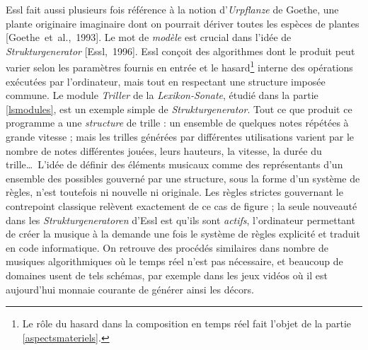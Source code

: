 \documentclass[a4paper,12pt]{article}
\newcommand{\cicite}[1]{{\footnotesize[#1]}}
\begin{document}
Essl fait aussi plusieurs fois référence à la notion d'\emph{Urpflanze} de Goethe, une plante originaire imaginaire dont on pourrait dériver toutes les espèces de plantes \cicite{Goethe~et~al.,~1993}. Le mot de \emph{modèle} est crucial dans l'idée de \emph{Strukturgenerator} \cicite{Essl,~1996}. Essl conçoit des algorithmes dont le produit peut varier selon les paramètres fournis en entrée et le hasard\footnote{Le rôle du hasard dans la composition en temps réel fait l'objet de la partie \ref{aspectsmateriels}.} interne des opérations exécutées par l'ordinateur, mais tout en respectant une structure imposée commune. Le module \emph{Triller} de la \emph{Lexikon-Sonate}, étudié dans la partie \ref{lsmodules}, est un exemple simple de \emph{Strukturgenerator}. Tout ce que produit ce programme a une \emph{structure} de trille : un ensemble de quelques notes répétées à grande vitesse ; mais les trilles générées par différentes utilisations varient par le nombre de notes différentes jouées, leurs hauteurs, la vitesse, la durée du trille\dots~L'idée de définir des éléments musicaux comme des représentants d'un ensemble des possibles gouverné par une structure, sous la forme d'un système de règles, n'est toutefois ni nouvelle ni originale. Les règles strictes gouvernant le contrepoint classique relèvent exactement de ce cas de figure ; la seule nouveauté dans les \emph{Strukturgeneratoren} d'Essl est qu'ils sont \emph{actifs}, l'ordinateur permettant de créer la musique à la demande une fois le système de règles explicité et traduit en code informatique. On retrouve des procédés similaires dans nombre de musiques algorithmiques où le temps réel n'est pas nécessaire, et beaucoup de domaines usent de tels schémas, par exemple dans les jeux vidéos où il est aujourd'hui monnaie courante de générer ainsi les décors. \\
\end{document}
